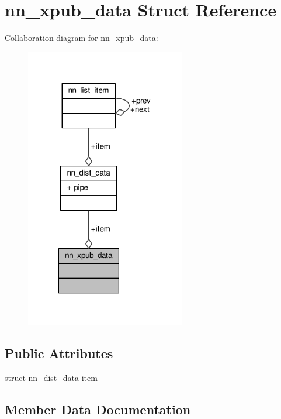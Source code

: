 \hypertarget{structnn__xpub__data}{}\section{nn\+\_\+xpub\+\_\+data Struct Reference}
\label{structnn__xpub__data}


Collaboration diagram for nn\+\_\+xpub\+\_\+data\+:\nopagebreak
\begin{figure}[H]
\begin{center}
\leavevmode
\includegraphics[width=198pt]{structnn__xpub__data__coll__graph}
\end{center}
\end{figure}
\subsection*{Public Attributes}
\begin{DoxyCompactItemize}
\item 
struct \hyperlink{structnn__dist__data}{nn\+\_\+dist\+\_\+data} \hyperlink{structnn__xpub__data_ae205fa1e647458bb9db4198cce6fcbfd}{item}
\end{DoxyCompactItemize}


\subsection{Member Data Documentation}
